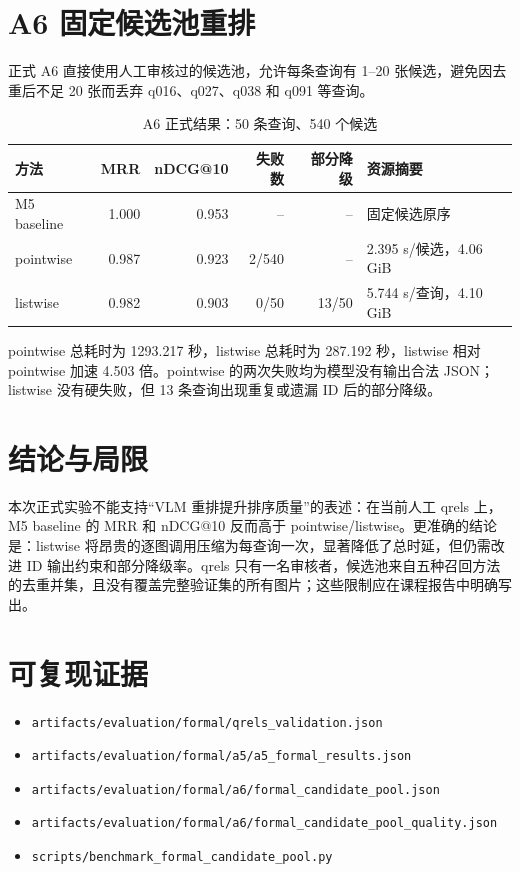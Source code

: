 \documentclass[UTF8,11pt,a4paper]{ctexart}
\begin{document}
\section{A6 固定候选池重排}
正式 A6 直接使用人工审核过的候选池，允许每条查询有 1--20 张候选，避免因去重后不足 20 张而丢弃 q016、q027、q038 和 q091 等查询。

\begin{table}[htbp]
\centering\small
\caption{A6 正式结果：50 条查询、540 个候选}
\begin{tabular}{lrrrrl}
\toprule
方法 & MRR & nDCG@10 & 失败数 & 部分降级 & 资源摘要\\
\midrule
M5 baseline & 1.000 & 0.953 & -- & -- & 固定候选原序\\
pointwise & 0.987 & 0.923 & 2/540 & -- & 2.395 s/候选，4.06 GiB\\
listwise & 0.982 & 0.903 & 0/50 & 13/50 & 5.744 s/查询，4.10 GiB\\
\bottomrule
\end{tabular}
\end{table}

pointwise 总耗时为 1293.217 秒，listwise 总耗时为 287.192 秒，listwise 相对 pointwise 加速 4.503 倍。pointwise 的两次失败均为模型没有输出合法 JSON；listwise 没有硬失败，但 13 条查询出现重复或遗漏 ID 后的部分降级。

\section{结论与局限}
本次正式实验不能支持“VLM 重排提升排序质量”的表述：在当前人工 qrels 上，M5 baseline 的 MRR 和 nDCG@10 反而高于 pointwise/listwise。更准确的结论是：listwise 将昂贵的逐图调用压缩为每查询一次，显著降低了总时延，但仍需改进 ID 输出约束和部分降级率。qrels 只有一名审核者，候选池来自五种召回方法的去重并集，且没有覆盖完整验证集的所有图片；这些限制应在课程报告中明确写出。

\section*{可复现证据}
\small
\begin{itemize}
\item \texttt{artifacts/evaluation/formal/qrels\_validation.json}
\item \texttt{artifacts/evaluation/formal/a5/a5\_formal\_results.json}
\item \texttt{artifacts/evaluation/formal/a6/formal\_candidate\_pool.json}
\item \texttt{artifacts/evaluation/formal/a6/formal\_candidate\_pool\_quality.json}
\item \texttt{scripts/benchmark\_formal\_candidate\_pool.py}
\end{itemize}
\end{document}
